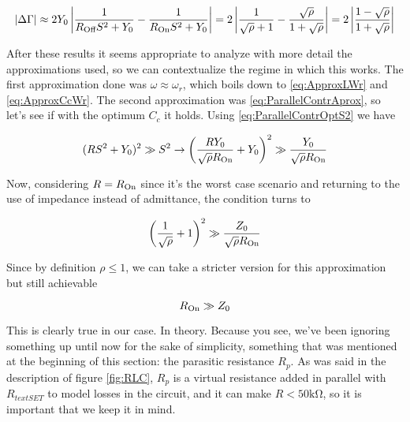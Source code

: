 \documentclass[../main.tex]{subfiles}
\begin{document}
\begin{equation}
\label{eq:OptimumParallelContr}
    |\Delta\Gamma| \approx 2Y_{0}\left|\frac{1}{
                   R_{\text{Off}} S^2 + Y_{0}} - \frac{1}{R_{\text{On}} S^2 + Y_{0}
               }\right|
                   = 2\left|
                   \frac{1}{\sqrt\rho + 1} - \frac{\sqrt\rho}{1 + \sqrt\rho}
                   \right|
                   = 2\left|
                   \frac{1 - \sqrt\rho}{1 + \sqrt\rho}
                   \right|
\end{equation}

After these results it seems appropriate to analyze with more detail the
approximations used, so we can contextualize the regime in which this works.
The first approximation done was \(\omega \approx \omega_{r}\), which boils
down to \ref{eq:ApproxLWr} and \ref{eq:ApproxCcWr}. The second approximation
was \ref{eq:ParallelContrAprox}, so let's see if with the optimum \(C_{c}\) it
holds. Using \ref{eq:ParallelContrOptS2} we have

\begin{equation}
    (RS^2 + Y_{0})^2 \gg S^2 \rightarrow
    \left(\frac{R Y_{0}}{\sqrt\rho R_{\text{On}}} + Y_{0}\right)^2 \gg
    \frac{Y_{0}}{\sqrt\rho R_{\text{On}}}
\end{equation}

Now, considering \(R = R_{\text{On}}\) since it's the worst case scenario and
returning to the use of impedance instead of admittance, the condition turns to

\begin{equation}
\label{eq:ProtoOptParallelContrApprox}
    \left(\frac{1}{\sqrt\rho} + 1\right)^2 \gg
    \frac{Z_{0}}{\sqrt\rho R_{\text{On}}}
\end{equation}

Since by definition \(\rho \leq 1\), we can take a stricter version for this
approximation but still achievable

\begin{equation}
\label{eq:OptParallelContrApprox}
    R_{\text{On}} \gg Z_{0}
\end{equation}

This is clearly true in our case. In theory. Because you see, we've been
ignoring something up until now for the sake of simplicity, something that was
mentioned at the beginning of this section: the parasitic resistance \(R_{p}\).
As was said in the description of figure \ref{fig:RLC}, \(R_{p}\) is a virtual
resistance added in parallel with \(R_{text{SET}}\) to model losses in the
circuit, and it can make \(R < 50\unit{\kilo\ohm}\), so it is important that
we keep it in mind.
\end{document}
